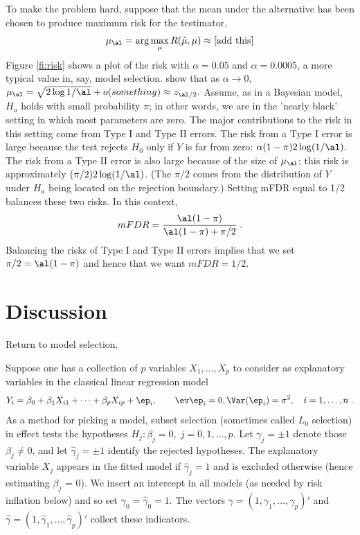 \documentclass[12pt]{article}
\begin{document}
 \clearpage

 To make the problem hard, suppose that the mean
 under the alternative has been chosen to produce maximum risk for the
 testimator,
 \begin{equation}
    \mu_\al = \arg \max_\mu R(\hat\mu,\mu) \approx \mbox{[add this]}
 \label{eq:Malpha}
 \end{equation}
 Figure \ref{fi:risk} shows a plot of the risk with $\alpha=0.05$ and
 $\alpha=0.0005$, a more typical value in, say, model selection.
  \citet{fostergeorge94} show that as $\alpha \rightarrow 0$, $\mu_\al = \sqrt{2
 \log 1/\al} + o(something) \approx z_{\al/2}.$ Assume, as in a Bayesian model,
 $H_a$ holds with small probability $\pi$; in other words, we are in the 'nearly
 black' setting in which most parameters are zero.  The major contributions to
 the risk in this setting come from Type I and Type II errors.  The risk from a
 Type I error is large because the test rejects $H_0$ only if $Y$ is far from
 zero: $\alpha (1-\pi) 2 \log(1/\al).$ The risk from a Type II error is also
 large because of the size of $\mu_\al$; this risk is approximately $(\pi/2) 2
 \log(1/\al)$. (The $\pi/2$ comes from the distribution of $Y$ under $H_a$ being
 located on the rejection boundary.)  Setting mFDR equal to 1/2 balances these
two risks.  In this context,
 \begin{equation}
    mFDR = \frac{\al(1-\pi)}
                {\al(1-\pi) + \pi/2} \;.   
 \label{eq:mfdrexample}
 \end{equation}
 Balancing the risks of Type I and Type II errors implies that we set
$\pi/2=\al(1-\pi)$ and hence that we want $mFDR = 1/2$.


\section{ Discussion }


 Return to model selection.

  Suppose one has a collection of $p$ variables $X_1, \ldots, X_p$ to consider as
 explanatory variables in the classical linear regression model
 \begin{equation}
   Y_i = \beta_0 + \beta_1 X_{i1} + \cdots + \beta_p X_{ip} + \ep_i, 
     \qquad \ev \ep_i = 0, \Var(\ep_i)=\sigma^2,  \quad i = 1,\ldots,n\;.
 \label{eq:regr}
 \end{equation}
 As a method for picking a model, subset selection (sometimes called $L_0$
 selection) in effect tests the hypotheses $H_j: \beta_j = 0, \; j = 0, 1, \ldots, p$.
  Let $\gamma_j = \pm 1$ denote those $\beta_j \ne 0$, and let $\hat\gamma_j =
 \pm 1$ identify the rejected hypotheses.  The explanatory variable $X_j$
 appears in the fitted model if $\hat\gamma_j = 1$ and is excluded otherwise
 (hence estimating $\beta_j$ = 0).  We insert an intercept in all models (as
 needed by risk inflation below) and so set $\gamma_0=\hat\gamma_0 = 1$.  The
 vectors $\gamma = (1, \gamma_1, \ldots, \gamma_p)'$ and $\hat\gamma = (1,
 \hat\gamma_1, \ldots, \hat\gamma_p)'$ collect these indicators.
\end{document}
